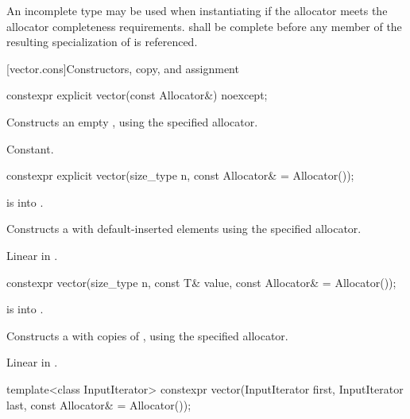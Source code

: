 \pnum
An incomplete type  may be used when instantiating 
if the allocator meets the
allocator completeness requirements.
 shall be complete before any member of the resulting specialization
of  is referenced.

[vector.cons]{Constructors, copy, and assignment}

\begin{itemdecl}
constexpr explicit vector(const Allocator&) noexcept;
\end{itemdecl}

\begin{itemdescr}
\pnum
\effects
Constructs an empty , using the
specified allocator.

\pnum
\complexity
Constant.
\end{itemdescr}

\begin{itemdecl}
constexpr explicit vector(size_type n, const Allocator& = Allocator());
\end{itemdecl}

\begin{itemdescr}
\pnum
\expects
{} is  into .

\pnum
\effects
Constructs a  with 
default-inserted elements using the specified allocator.

\pnum
\complexity
Linear in .
\end{itemdescr}

\begin{itemdecl}
constexpr vector(size_type n, const T& value,
                 const Allocator& = Allocator());
\end{itemdecl}

\begin{itemdescr}
\pnum
\expects
{} is
 into .

\pnum
\effects
Constructs a  with 
copies of , using the specified allocator.

\pnum
\complexity
Linear in .
\end{itemdescr}

\begin{itemdecl}
template<class InputIterator>
  constexpr vector(InputIterator first, InputIterator last,
                   const Allocator& = Allocator());
\end{itemdecl}

